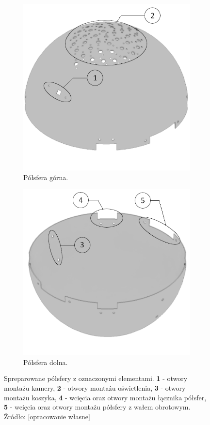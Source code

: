 \begin{figure}
	\centering
	
	\begin{subfigure}[b]{.49\textwidth}
			\centering
			\includegraphics[width=.6\textwidth]{top_half_marked}
			\caption{Półsfera górna.} 
			\label{fig:globus_top}
	\end{subfigure}
	\hfill%
	\begin{subfigure}[b]{.49\textwidth}
			\centering
			\includegraphics[width=.6\textwidth]{bot_half_marked}
			\caption{Półsfera dolna.} 
			\label{fig:globus_bot}
	\end{subfigure}
	\caption{Spreparowane półsfery z oznaczonymi elementami. \textbf{1} - otwory montażu kamery, \textbf{2} - otwory montażu oświetlenia, \textbf{3} - otwory montażu koszyka, \textbf{4} - wcięcia oraz otwory montażu łącznika półsfer, \textbf{5} - wcięcia oraz otwory montażu półsfery z wałem obrotowym. Źródło: [opracowanie własne]}
	\label{fig:globus}

\end{figure}


